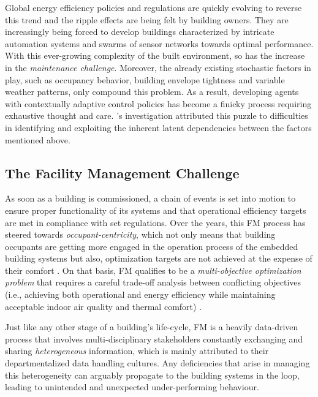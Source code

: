 Global energy efficiency policies and regulations are quickly evolving to reverse this trend \citep{Zhou2020Energy-efficientWaves, Viguie2020EarlyParis, InternationalEnergyAgencyIEA2023EnergyVersailles} and the ripple effects are being felt by building owners. They are increasingly being forced to develop buildings characterized by intricate automation systems and swarms of sensor networks towards optimal performance. With this ever-growing complexity of the built environment, so has the increase in the \textit{maintenance challenge}. Moreover, the already existing stochastic factors in play, such as occupancy behavior, building envelope tightness and variable weather patterns, only compound this problem. As a result, developing agents with contextually adaptive control policies has become a finicky process requiring exhaustive thought and care. \cite{Curry2012}'s investigation attributed this puzzle to difficulties in identifying and exploiting the inherent latent dependencies between the factors mentioned above.
 
\subsection{The Facility Management Challenge}
As soon as a building is commissioned, a chain of events is set into motion to ensure proper functionality of its systems and that operational efficiency targets are met in compliance with set regulations. Over the years, this \ac{FM} process has steered towards \textit{occupant-centricity}, which not only means that building occupants are getting more engaged in the operation process of the embedded building systems but also, optimization targets are not achieved at the expense of their comfort \citep{Park2018ComprehensiveReview, Park2019AControls, Park2019LightLearn:Learning, OBrien2020AnStandards, Park2022TowardHubs, Jia2023Occupant3.0, Deng2023Learning-BasedWorkplaces}. On that basis, \ac{FM} qualifies to be a \textit{multi-objective optimization problem} that requires a careful trade-off analysis between conflicting objectives (i.e., achieving both operational and energy efficiency while maintaining acceptable indoor air quality and thermal comfort) \citep{Toffolo2002, Delgarm2016, Shaikh2018, Yong2020Multi-objectiveParameters, Wang2023AnPerspectives}. 

Just like any other stage of a building's life-cycle, \ac{FM} is a heavily data-driven process that involves multi-disciplinary stakeholders constantly exchanging and sharing \textit{heterogeneous} information, which is mainly attributed to their departmentalized data handling cultures. Any deficiencies that arise in managing this heterogeneity can arguably propagate to the building systems in the loop, leading to unintended and unexpected under-performing behaviour.

